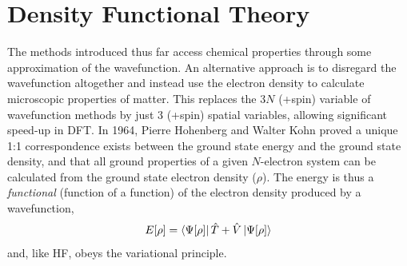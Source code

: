 \section{Density Functional Theory}\label{section: theory_dft}
The methods introduced thus far access chemical properties through some approximation of the wavefunction. An alternative approach is to disregard the wavefunction altogether and instead use the electron density to calculate microscopic properties of matter. This replaces the 3$N$ (+spin) variable of wavefunction methods by just 3 (+spin) spatial variables, allowing significant speed-up in \ac{DFT}. In 1964, Pierre Hohenberg and Walter Kohn proved a unique 1:1 correspondence exists between the ground state energy and the ground state density, and that all ground properties of a given $N$-electron system can be calculated from the ground state electron density ($\rho$).\cite{Kohn1964} The energy is thus a \textit{functional} (function of a function) of the electron density produced by a wavefunction,
\begin{equation}
    E[\rho]=\bra{\Psi[\rho]}\hat{T}+\hat{V}\ket{\Psi[\rho]}
\end{equation}
and, like \ac{HF}, obeys the variational principle.

